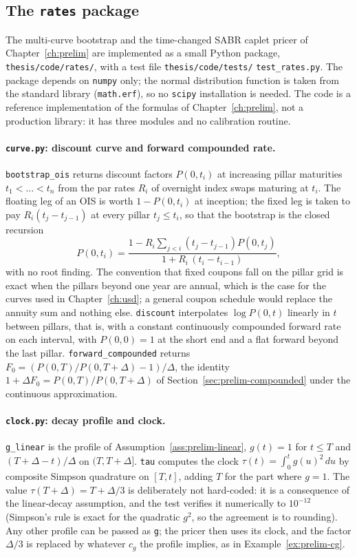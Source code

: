 \subsection{The \texttt{rates} package}\label{subsec:appC-rates}

The multi-curve bootstrap and the time-changed SABR caplet pricer of Chapter~\ref{ch:prelim} are implemented as a small Python package, \texttt{thesis/code/rates/}, with a test file \texttt{thesis/code/tests/} \texttt{test\_rates.py}. The package depends on \texttt{numpy} only; the normal distribution function is taken from the standard library (\texttt{math.erf}), so no \texttt{scipy} installation is needed. The code is a reference implementation of the formulas of Chapter~\ref{ch:prelim}, not a production library: it has three modules and no calibration routine.

\paragraph{\texttt{curve.py}: discount curve and forward compounded rate.}
\texttt{bootstrap\_ois} returns discount factors $P(0,t_i)$ at increasing pillar maturities $t_1<\dots<t_n$ from the par rates $R_i$ of overnight index swaps maturing at $t_i$. The floating leg of an OIS is worth $1-P(0,t_i)$ at inception; the fixed leg is taken to pay $R_i(t_j-t_{j-1})$ at every pillar $t_j\le t_i$, so that the bootstrap is the closed recursion
\[
P(0,t_i)=\frac{1-R_i\sum_{j<i}(t_j-t_{j-1})P(0,t_j)}{1+R_i\,(t_i-t_{i-1})},
\]
with no root finding. The convention that fixed coupons fall on the pillar grid is exact when the pillars beyond one year are annual, which is the case for the curves used in Chapter~\ref{ch:usd}; a general coupon schedule would replace the annuity sum and nothing else. \texttt{discount} interpolates $\log P(0,t)$ linearly in $t$ between pillars, that is, with a constant continuously compounded forward rate on each interval, with $P(0,0)=1$ at the short end and a flat forward beyond the last pillar. \texttt{forward\_compounded} returns $F_0=(P(0,T)/P(0,T+\Delta)-1)/\Delta$, the identity $1+\Delta F_0=P(0,T)/P(0,T+\Delta)$ of Section~\ref{sec:prelim-compounded} under the continuous approximation.

\paragraph{\texttt{clock.py}: decay profile and clock.}
\texttt{g\_linear} is the profile of Assumption~\ref{ass:prelim-linear}, $g(t)=1$ for $t\le T$ and $(T+\Delta-t)/\Delta$ on $(T,T+\Delta]$. \texttt{tau} computes the clock $\tau(t)=\int_0^tg(u)^2\,du$ by composite Simpson quadrature on $[T,t]$, adding $T$ for the part where $g=1$. The value $\tau(T+\Delta)=T+\Delta/3$ is deliberately not hard-coded: it is a consequence of the linear-decay assumption, and the test verifies it numerically to $10^{-12}$ (Simpson's rule is exact for the quadratic $g^2$, so the agreement is to rounding). Any other profile can be passed as \texttt{g}; the pricer then uses its clock, and the factor $\Delta/3$ is replaced by whatever $c_g$ the profile implies, as in Example~\ref{ex:prelim-cg}.

